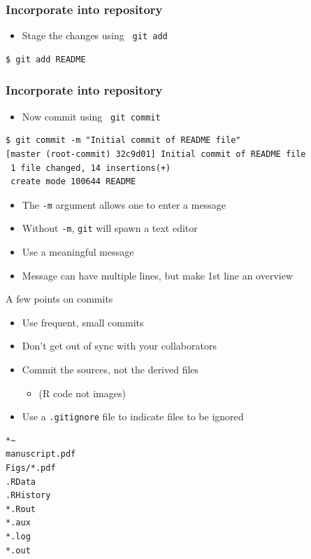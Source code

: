 \documentclass[12pt,t]{beamer}
\newcommand{\bi}{\begin{itemize}}
\newcommand{\bbi}{\vspace{24pt} \begin{itemize} \itemsep8pt}
\newcommand{\ei}{\end{itemize}}
\begin{document}
\begin{frame}[fragile]
\frametitle{Incorporate into repository}
\bbi
\item Stage the changes using {\tt \color{hilit} git add}
\ei

\begin{lstlisting}
$ git add README
\end{lstlisting}

\note{
}
\end{frame}

\begin{frame}[fragile]
\frametitle{Incorporate into repository}
\bbi
\item Now commit using {\tt \color{hilit} git commit}
\ei

\begin{lstlisting}
$ git commit -m "Initial commit of README file"
[master (root-commit) 32c9d01] Initial commit of README file
 1 file changed, 14 insertions(+)
 create mode 100644 README
\end{lstlisting}

\bi
\item The \texttt{-m} argument allows one to enter a message
\item Without \texttt{-m}, \texttt{git} will spawn a text editor
\item Use a meaningful message
\item Message can have multiple lines, but make 1st line an overview
\ei

\note{
}
\end{frame}




\begin{frame}[fragile]{A few points on commits}
\bbi
\item Use frequent, small commits
\item Don't get out of sync with your collaborators
\item Commit the sources, not the derived files
\bi
\item[] (R code not images)
\ei
\item Use a {\tt .gitignore} file to indicate files to be ignored
\ei

\begin{lstlisting}
*~
manuscript.pdf
Figs/*.pdf
.RData
.RHistory
*.Rout
*.aux
*.log
*.out
\end{lstlisting}

\note{
}
\end{frame}
\end{document}
